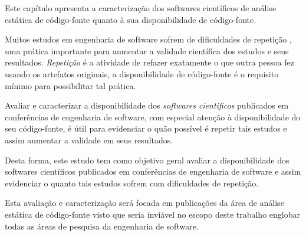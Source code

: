 {Este capítulo apresenta a caracterização dos softwares científicos de análise
estática de código-fonte quanto à sua disponibilidade de código-fonte.}
\label{caracterizacao-ferramentas}

Muitos estudos em engenharia de software sofrem de dificuldades de repetição
\cite{Tang2016}, uma prática importante para aumentar a validade científica dos
estudos e seus resultados. {\it Repetição} é a atividade de refazer exatamente
o que outra pessoa fez usando os artefatos originais, a disponibilidade de
código-fonte é o requisito mínimo para possibilitar tal prática.

Avaliar e caracterizar a disponibilidade dos {\it softwares cientificos}
publicados em conferências de engenharia de software, com especial atenção à
disponibilidade do seu código-fonte, é útil para evidenciar o quão possível é
repetir tais estudos e assim aumentar a validade em seus resultados.

Desta forma, este estudo tem como objetivo geral avaliar a disponibilidade dos
softwares científicos publicados em conferências de engenharia de software e
assim evidenciar o quanto tais estudos sofrem com dificuldades de repetição.

Esta avaliação e caracterização será focada em publicações da área de análise
estática de código-fonte visto que seria inviável no escopo deste trabalho
englobar todas as áreas de pesquisa da engenharia de software.





